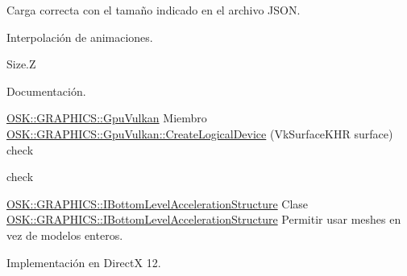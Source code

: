
\begin{DoxyRefList}
\item[Clase \mbox{\hyperlink{class_o_s_k_1_1_a_s_s_e_t_s_1_1_anim_mesh_loader}{OSK\+::ASSETS\+::Anim\+Mesh\+Loader}} ]\label{todo__todo000002}%
%
Carga correcta con el tamaño indicado en el archivo JSON.  
\item[Clase \mbox{\hyperlink{class_o_s_k_1_1_g_r_a_p_h_i_c_s_1_1_animator}{OSK\+::GRAPHICS\+::Animator}} ]\label{todo__todo000001}%
%
Interpolación de animaciones.  
\item[Miembro \mbox{\hyperlink{class_o_s_k_1_1_g_r_a_p_h_i_c_s_1_1_command_list_vulkan_aadf5b8b38327576a65816803cf7fee3c}{OSK\+::GRAPHICS\+::Command\+List\+Vulkan\+::Copy\+Image\+To\+Image}} (const \mbox{\hyperlink{class_o_s_k_1_1_g_r_a_p_h_i_c_s_1_1_gpu_image}{Gpu\+Image}} $\ast$source, \mbox{\hyperlink{class_o_s_k_1_1_g_r_a_p_h_i_c_s_1_1_gpu_image}{Gpu\+Image}} $\ast$destination, TSize num\+Layers, TSize src\+Start\+Layer, TSize dst\+Start\+Layer, TSize src\+Mip\+Level, TSize dst\+Mip\+Level, Vector2ui copy\+Size) override]\label{todo__todo000003}%
%
Size.\+Z  
\item[Miembro \mbox{\hyperlink{namespace_o_s_k_1_1_g_r_a_p_h_i_c_s_a5c67a4dab480f62eb6083332acdcb8c7a5b39c8b553c821e7cddc6da64b5bd2ee}{OSK\+::GRAPHICS\+::DEFAULT}} ]\label{todo__todo000005}%
%
Documentación. 
\end{DoxyRefList}

\mbox{\hyperlink{class_o_s_k_1_1_g_r_a_p_h_i_c_s_1_1_gpu_vulkan}{OSK\+::\+GRAPHICS\+::\+Gpu\+Vulkan}} Miembro \mbox{\hyperlink{class_o_s_k_1_1_g_r_a_p_h_i_c_s_1_1_gpu_vulkan_a5a806e010c5e1feabf3cc82ff7ec3d37}{OSK\+::GRAPHICS\+::Gpu\+Vulkan\+::Create\+Logical\+Device}} (Vk\+Surface\+KHR surface) \label{todo__todo000009}%
%
check 

\label{todo__todo000010}%
%
check  

\mbox{\hyperlink{class_o_s_k_1_1_g_r_a_p_h_i_c_s_1_1_i_bottom_level_acceleration_structure}{OSK\+::\+GRAPHICS\+::\+IBottom\+Level\+Acceleration\+Structure}} Clase \mbox{\hyperlink{class_o_s_k_1_1_g_r_a_p_h_i_c_s_1_1_i_bottom_level_acceleration_structure}{OSK\+::GRAPHICS\+::IBottom\+Level\+Acceleration\+Structure}}  \label{todo__todo000006}%
%
Permitir usar meshes en vez de modelos enteros. 

Implementación en DirectX 12.  

